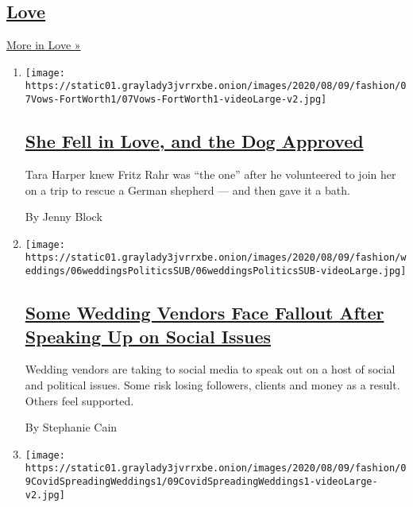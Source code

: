 \hypertarget{love}{%
\subsection{\texorpdfstring{\href{/section/fashion/weddings}{Love}}{Love}}\label{love}}

\href{/section/fashion/weddings}{More in Love »}

\begin{enumerate}
\def\labelenumi{\arabic{enumi}.}
\item
  \texttt{[image: https://static01.graylady3jvrrxbe.onion/images/2020/08/09/fashion/07Vows-FortWorth1/07Vows-FortWorth1-videoLarge-v2.jpg]}

  \hypertarget{she-fell-in-love-and-the-dog-approved}{%
  \subsection{\texorpdfstring{\href{/2020/08/07/fashion/weddings/Tara-Harper-and-Fritz-Rahr-Fort-Worth-wedding.html}{She
  Fell in Love, and the Dog
  Approved}}{She Fell in Love, and the Dog Approved}}\label{she-fell-in-love-and-the-dog-approved}}

  Tara Harper knew Fritz Rahr was ``the one'' after he volunteered to
  join her on a trip to rescue a German shepherd --- and then gave it a
  bath.

  By Jenny Block
\item
  \texttt{[image: https://static01.graylady3jvrrxbe.onion/images/2020/08/09/fashion/weddings/06weddingsPoliticsSUB/06weddingsPoliticsSUB-videoLarge.jpg]}

  \hypertarget{some-wedding-vendors-face-fallout-after-speaking-up-on-social-issues}{%
  \subsection{\texorpdfstring{\href{/2020/08/06/fashion/weddings/wedding-vendors-social-issues.html}{Some
  Wedding Vendors Face Fallout After Speaking Up on Social
  Issues}}{Some Wedding Vendors Face Fallout After Speaking Up on Social Issues}}\label{some-wedding-vendors-face-fallout-after-speaking-up-on-social-issues}}

  Wedding vendors are taking to social media to speak out on a host of
  social and political issues. Some risk losing followers, clients and
  money as a result. Others feel supported.

  By Stephanie Cain
\item
  \texttt{[image: https://static01.graylady3jvrrxbe.onion/images/2020/08/09/fashion/09CovidSpreadingWeddings1/09CovidSpreadingWeddings1-videoLarge-v2.jpg]}


\end{enumerate}

